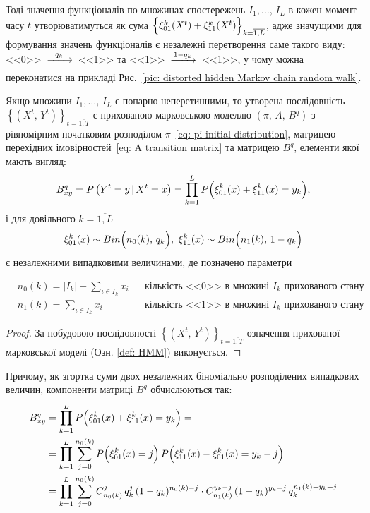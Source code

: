 Тоді значення функціоналів по множинах спостережень $I_1,\ldots,\,I_L$ в кожен момент часу $t$ утворюватимуться як сума $\Bigl\{ \xi^k_{01}(X^t) + \xi^k_{11}(X^t) \Bigr\}_{k=\overline{1,L}}$, адже значущими для формування значень функціоналів є незалежні перетворення саме такого виду: <<0>>~$\xrightarrow[\hspace{7mm}]{q_k}$~<<1>> та <<1>>~$\xrightarrow[\hspace{7mm}]{1-q_k}$~<<1>>, у чому можна переконатися на прикладі Рис.~\ref{pic: distorted hidden Markov chain random walk}.

\begin{claim}\label{claim: distorted HMM}
    Якщо множини $I_1,\ldots,\,I_L$ є попарно неперетинними, то утворена послідовність $\left\{ \left( X^t,\,Y^t \right) \right\}_{t=\overline{1,T}}$ є прихованою марковською моделлю $\left( \pi,\,A,\,B^q \right)$ з рівномірним початковим розподілом $\pi$~\eqref{eq: pi initial distribution}, матрицею перехідних імовірностей~\eqref{eq: A transition matrix} та матрицею $B^q$, елементи якої мають вигляд:
    \begin{equation*}
        B^q_{xy} = P\left( Y^t=y\,|\,X^t=x \right) = \prod\limits_{k=1}^{L} P\Bigl( \xi^k_{01}(x) + \xi^k_{11}(x) = y_k \Bigr),
    \end{equation*}
    і для довільного $k=\overline{1,L}$
    \begin{equation}\label{eq: xi}
        \xi^k_{01}(x) \sim Bin\Bigl( n_{0}(k),\, q_k \Bigr),\ \xi^k_{11}(x) \sim Bin\Bigl( n_{1}(k),\, 1 - q_k \Bigr)
    \end{equation}
    є незалежними випадковими величинами, де позначено параметри

    \begin{align*}
        &n_{0}(k) = |I_k| - \sum_{i \in I_k} x_i && \text{кількість <<0>> в множині $I_k$ прихованого стану} \\
        &n_{1}(k) = \sum_{i \in I_k} x_i && \text{кількість <<1>> в множині $I_k$ прихованого стану}
    \end{align*}
\end{claim}
\begin{proof}
    За побудовою послідовності $\left\{ \left( X^t,\,Y^t \right) \right\}_{t=\overline{1,T}}$ означення прихованої марковської моделі (Озн. \ref{def: HMM}) виконується. 
\end{proof}

Причому, як згортка суми двох незалежних біноміально розподілених випадкових величин, компоненти матриці $B^q$ обчислюються так:
\begin{align*}
    B^q_{xy} & = \prod\limits_{k=1}^{L} P\Bigl( \xi^k_{01}(x) + \xi^k_{11}(x) = y_k \Bigr) = \\
    & = \prod\limits_{k=1}^{L} \sum\limits_{j=0}^{n_0(k)} P\Bigl( \xi^k_{01}(x) = j \Bigr)\, P\Bigl( \xi^k_{11}(x) - \xi^k_{01}(x) = y_k - j \Bigr) \\
    & = \prod\limits_{k=1}^{L} \sum\limits_{j=0}^{n_0(k)} C_{n_0(k)}^j\, q_k^j\, (1-q_k)^{n_0(k)-j} \cdot C_{n_1(k)}^{y_k-j}\, (1-q_k)^{y_k-j}\, q_k^{n_1(k)-y_k+j}
\end{align*}
\label{eq: convolution}

